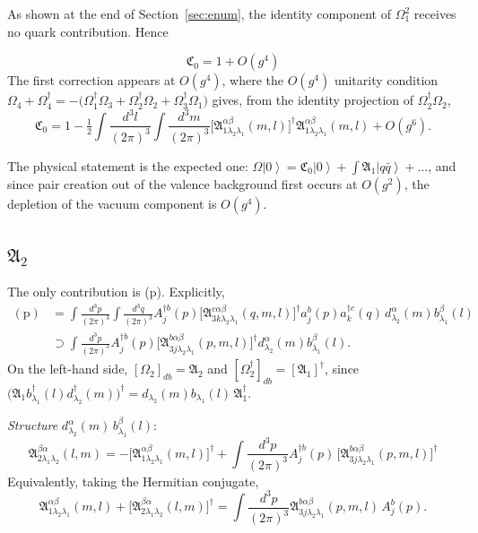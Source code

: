 \documentclass[11pt]{article}
\newcommand{\mf}{\mathfrak}
\newcommand{\dg}{\dagger}
\newcommand{\ip}[1]{\int\!\frac{d^{3}#1}{(2\pi)^{3}}}
\newcommand{\ket}[1]{\left|#1\right\rangle}
\newcommand{\vac}{\ket{0}}
\newcommand{\OM}{\Omega}
\newcommand{\half}{\tfrac12}
\begin{document}
As shown at the end of Section~\ref{sec:enum}, the identity component of $\OM_{1}^{2}$ receives no
quark contribution. Hence

\begin{res}
\begin{equation}
\boxed{\;\mf C_{0}=1+O(g^{4})\;}
\label{eq:C0}
\end{equation}
The first correction appears at $O(g^{4})$, where the $O(g^{4})$ unitarity condition
$\OM_{4}+\OM^{\dg}_{4}=-\big(\OM^{\dg}_{1}\OM_{3}+\OM^{\dg}_{2}\OM_{2}+\OM^{\dg}_{3}\OM_{1}\big)$
gives, from the identity projection of $\OM^{\dg}_{2}\OM_{2}$,
\begin{equation}
\mf C_{0}=1-\half\ip{l}\ip{m}
\Big[\mf A^{\alpha\beta}_{1\lambda_{2}\lambda_{1}}(m,l)\Big]^{\dg}
\mf A^{\alpha\beta}_{1\lambda_{2}\lambda_{1}}(m,l)+O(g^{6}).
\end{equation}
\end{res}

\noindent
The physical statement is the expected one: $\OM\vac=\mf C_{0}\vac+\int \mf A_{1}\ket{q\bar q}+\dots$,
and since pair creation out of the valence background first occurs at $O(g^{2})$, the
depletion of the vacuum component is $O(g^{4})$.

\subsection{$\mf A_{2}$}

The only contribution is (p). Explicitly,
\begin{align}
(\text{p})&=\ip{p}\ip{q}A^{\dg b}_{j}(p)\Big[\mf A^{c\alpha\beta}_{3k\lambda_{2}\lambda_{1}}(q,m,l)\Big]^{\dg}
a^{b}_{j}(p)a^{\dg c}_{k}(q)\,d^{\alpha}_{\lambda_{2}}(m)b^{\beta}_{\lambda_{1}}(l)
\nonumber\\
&\supset\ip{p}A^{\dg b}_{j}(p)\Big[\mf A^{b\alpha\beta}_{3j\lambda_{2}\lambda_{1}}(p,m,l)\Big]^{\dg}
d^{\alpha}_{\lambda_{2}}(m)b^{\beta}_{\lambda_{1}}(l).
\end{align}
On the left-hand side, $[\OM_{2}]_{db}=\mf A_{2}$ and
$[\OM^{\dg}_{2}]_{db}=[\mf A_{1}]^{\dg}$, since
$\big(\mf A_{1}b^{\dg}_{\lambda_1}(l)d^{\dg}_{\lambda_2}(m)\big)^{\dg}
=d_{\lambda_2}(m)b_{\lambda_1}(l)\,\mf A^{\dg}_{1}$.

\begin{res}
\emph{Structure} $d^{\alpha}_{\lambda_{2}}(m)\,b^{\beta}_{\lambda_{1}}(l)$:
\begin{equation}
\boxed{\;
\mf A^{\beta\alpha}_{2\lambda_{1}\lambda_{2}}(l,m)
=-\Big[\mf A^{\alpha\beta}_{1\lambda_{2}\lambda_{1}}(m,l)\Big]^{\dg}
+\ip{p}A^{\dg b}_{j}(p)\,\Big[\mf A^{b\alpha\beta}_{3j\lambda_{2}\lambda_{1}}(p,m,l)\Big]^{\dg}
\;}
\label{eq:A2}
\end{equation}
Equivalently, taking the Hermitian conjugate,
\begin{equation}
\mf A^{\alpha\beta}_{1\lambda_{2}\lambda_{1}}(m,l)
+\Big[\mf A^{\beta\alpha}_{2\lambda_{1}\lambda_{2}}(l,m)\Big]^{\dg}
=\ip{p}\mf A^{b\alpha\beta}_{3j\lambda_{2}\lambda_{1}}(p,m,l)\,A^{b}_{j}(p).
\label{eq:A2conj}
\end{equation}
\end{res}
\end{document}
